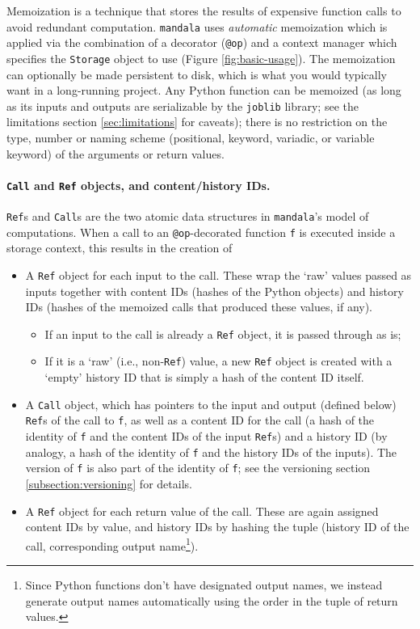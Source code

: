 \documentclass{article} %
\begin{document}
Memoization is a technique that stores the results of expensive function calls
to avoid redundant computation. \texttt{mandala} uses \emph{automatic}
memoization \citep{norvig1991techniques} which is applied via the combination of
a decorator (\texttt{@op}) and a context manager which specifies the
\texttt{Storage} object to use (Figure \ref{fig:basic-usage}). The memoization
can optionally be made persistent to disk, which is what you would typically
want in a long-running project. Any Python function can be memoized (as long as
its inputs and outputs are serializable by the \texttt{joblib} library; see the
limitations section \ref{sec:limitations} for caveats); there is no restriction
on the type, number or naming scheme (positional, keyword, variadic, or variable
keyword) of the arguments or return values.

\paragraph{\texttt{Call} and \texttt{Ref} objects, and content/history IDs.}
\texttt{Ref}s and \texttt{Call}s are the two atomic data structures in
\texttt{mandala}'s model of computations. When a call to an
\texttt{@op}-decorated function \texttt{f} is executed inside a storage context,
this results in the creation of 
\begin{itemize}
\item A \texttt{Ref} object for each input to the call. These wrap the `raw'
values passed as inputs together with content IDs (hashes of the Python objects)
and history IDs (hashes of the memoized calls that produced these values, if
any). 
\begin{itemize}
\item If an input to the call is already a \texttt{Ref} object, it is passed
through as is;
\item If it is a `raw' (i.e., non-\texttt{Ref}) value, a new \texttt{Ref} object
is created with a `empty' history ID that is simply a hash of the content ID
itself.
\end{itemize}
\item A \texttt{Call} object, which has pointers to the input and output
(defined below) \texttt{Ref}s of the call to \texttt{f}, as well as a content ID
for the call (a hash of the identity of \texttt{f} and the content IDs of the
input \texttt{Ref}s) and a history ID (by analogy, a hash of the identity of
\texttt{f} and the history IDs of the inputs). The version of \texttt{f} is also part of the identity of \texttt{f}; see the versioning section \ref{subsection:versioning} for details.
\item A \texttt{Ref} object for each return value of the call. These are again
assigned content IDs by value, and history IDs by hashing the tuple (history ID
of the call, corresponding output name\footnote{Since Python functions don't
have designated output names, we instead generate output names automatically using the order in the tuple of return values.}).
\end{itemize}
\end{document}
